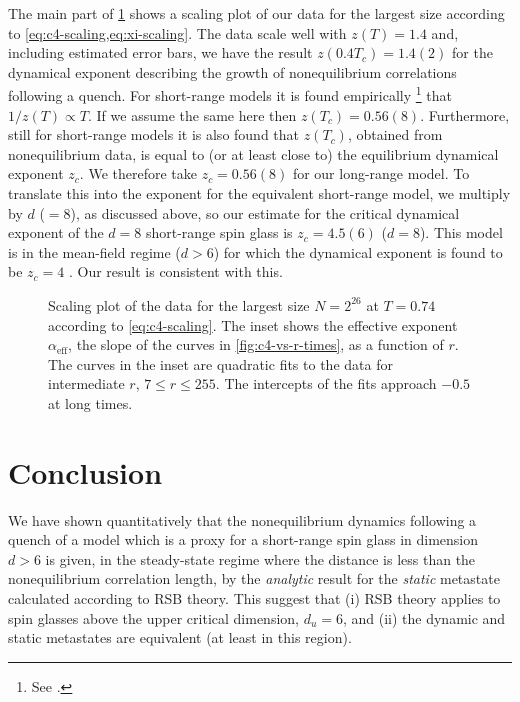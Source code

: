 The main part of \cref{fig:c4-scaling} shows a scaling plot of our data for the
largest size according to \cref{eq:c4-scaling,eq:xi-scaling}. The data scale
well with $z(T)=1.4$ and, including estimated error bars, we have the result
$z(0.4 T_c)=1.4(2)$ for the dynamical exponent describing the growth of
nonequilibrium correlations following a quench. For short-range models it is
found empirically%
\footnote{%
  See
  \textcite{%
    manssen2015aging,%
    rieger1993nonequilibrium,%
    marinari1996numerical,%
    yoshino2002extended%
  }.
}
that $1/z(T) \propto T$. If we assume the same here then $z(T_c)=0.56(8)$.
Furthermore, still for short-range models it is also found that $z(T_c)$,
obtained from nonequilibrium data, is equal to (or at least close to)
the equilibrium dynamical exponent $z_c$. We therefore take $z_c=0.56(8)$
for our long-range model. To translate this into the exponent for the
equivalent short-range model, we multiply by $d$ ($=8$), as discussed above,
so our estimate for the critical dynamical exponent of the $d=8$ short-range
spin glass is $z_c=4.5(6)$ ($d=8$). This model is in the mean-field regime
($d>6$) for which the dynamical exponent is found to be $z_c=4$
\autocite{zippelius1984critical}. Our result is consistent with this.

\begin{figure}
  \centering
  
  \caption[
    Scaling plot of data for the dynamical correlation function $C_4(r,t)$ at
    different times for the one-dimensional long-range diluted spin glass with
    $\sigma=0.74$ at $T=0.4T_c$.
  ]
  {
    Scaling plot of the data for the largest size $N=2^{26}$ at $T=0.74$
    according to \cref{eq:c4-scaling}. The inset shows the effective exponent
    $\alpha_{\mathrm{eff}}$, the slope of the curves in
    \cref{fig:c4-vs-r-times}, as a function of $r$. The curves in the inset are
    quadratic fits to the data for intermediate $r$, $7 \leq r \leq 255$. The
    intercepts of the fits approach $-0.5$ at long times.
  }
  \label{fig:c4-scaling}
\end{figure}


\section{Conclusion}

We have shown quantitatively that the nonequilibrium dynamics following a
quench of a model which is a proxy for a short-range spin glass in dimension
$d>6$ is given, in the steady-state regime where the distance is less than the
nonequilibrium correlation length, by the \emph{analytic} result for the
\emph{static} metastate calculated according to RSB theory. This suggest that
(i) RSB theory applies to spin glasses above the upper critical dimension,
$d_u=6$, and (ii) the dynamic and static metastates are equivalent (at least in
this region).
